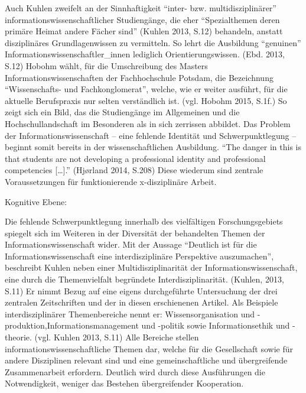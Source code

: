 \documentclass[a4paper,
fontsize=11pt,
oneside,
numbers=noperiodatend,
parskip=half-,
bibliography=totoc,
final
]{scrartcl}
\begin{document}
Auch Kuhlen zweifelt an der Sinnhaftigkeit \enquote{inter- bzw.
multidisziplinärer} informationswissenschaftlicher Studiengänge, die
eher \enquote{Spezialthemen deren primäre Heimat andere Fächer sind}
(Kuhlen 2013, S.12) behandeln, anstatt disziplinäres Grundlagenwissen zu
vermitteln. So lehrt die Ausbildung \enquote{genuinen}
Informationswissenschaftler\_innen lediglich Orientierungswissen. (Ebd.
2013, S.12) Hobohm wählt, für die Umschreibung des Masters
Informationswissenschaften der Fachhochschule Potsdam, die Bezeichnung
\enquote{Wissenschafts- und Fachkonglomerat}, welche, wie er weiter
ausführt, für die aktuelle Berufspraxis nur selten verständlich ist.
(vgl. Hobohm 2015, S.1f.) So zeigt sich ein Bild, das die Studiengänge
im Allgemeinen und die Hochschullandschaft im Besonderen als in sich
zerrissen abbildet. Das Problem der Informationswissenschaft -- eine
fehlende Identität und Schwerpunktlegung -- beginnt somit bereits in der
wissenschaftlichen Ausbildung. \enquote{The danger in this is that
students are not developing a professional identity and professional
competencies {[}\ldots{}{]}.} (Hjørland 2014, S.208) Diese wiederum sind
zentrale Voraussetzungen für funktionierende x-disziplinäre Arbeit.

Kognitive Ebene:

Die fehlende Schwerpunktlegung innerhalb des vielfältigen
Forschungsgebiets spiegelt sich im Weiteren in der Diversität der
behandelten Themen der Informationswissenschaft wider. Mit der Aussage
\enquote{Deutlich ist für die Informationswissenschaft eine
interdisziplinäre Perspektive auszumachen}, beschreibt Kuhlen neben
einer Multidisziplinarität der Informationswissenschaft, eine durch die
Themenvielfalt begründete Interdisziplinarität. (Kuhlen, 2013, S.11) Er
nimmt Bezug auf eine eigens durchgeführte Untersuchung der drei
zentralen Zeitschriften und der in diesen erschienenen Artikel. Als
Beispiele interdisziplinärer Themenbereiche nennt er:
Wissensorganisation und -produktion,Informationsmanagement und -politik
sowie Informationsethik und -theorie. (vgl. Kuhlen 2013, S.11) Alle
Bereiche stellen informationswissenschaftliche Themen dar, welche für
die Gesellschaft sowie für andere Disziplinen relevant sind und eine
gemeinschaftliche und übergreifende Zusammenarbeit erfordern. Deutlich
wird durch diese Ausführungen die Notwendigkeit, weniger das Bestehen
übergreifender Kooperation.
\end{document}

